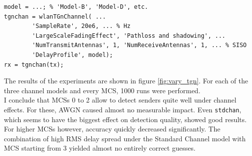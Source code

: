 \begin{lstlisting}[captionpos=b,caption={Matlab wlanTGnChannel Simulation},label=lst:tgn]
model = ...; % 'Model-B', 'Model-D', etc.
tgnchan = wlanTGnChannel( ...
        'SampleRate', 20e6, ... % Hz
        'LargeScaleFadingEffect', 'Pathloss and shadowing', ...
        'NumTransmitAntennas', 1, 'NumReceiveAntennas', 1, ... % SISO
        'DelayProfile', model);
rx = tgnchan(tx);
\end{lstlisting}

The results of the experiments are shown in figure \ref{fig:vary_tgn}. For each of the three channel models and every \gls{MCS}, 1000 runs were performed.\\

I conclude that \glspl{MCS} 0 to 2 allow to detect senders quite well under channel effects. For these, \gls{AWGN} caused almost no measurable impact. Even \texttt{stdchan}, which seems to have the biggest effect on detection quality, showed good results. For higher \glspl{MCS} however, accuracy quickly decreased significantly. The combination of high \gls{RMS} delay spread under the Standard Channel model with \gls{MCS} starting from 3 yielded almost no entirely correct guesses.

